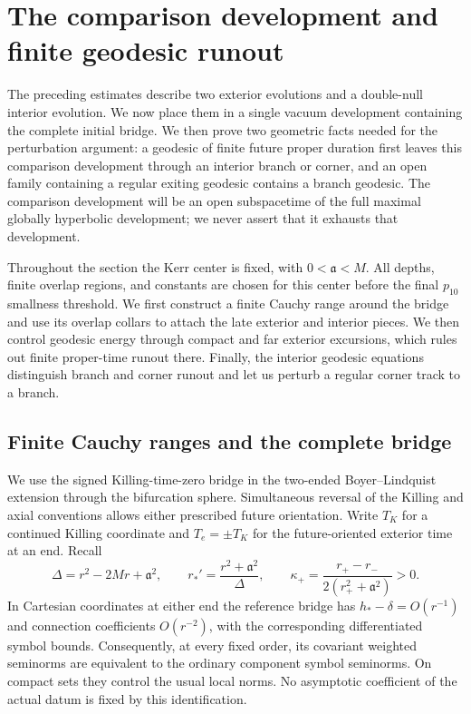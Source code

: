 \section{The comparison development and finite geodesic runout}
\label{sec:comparison}

The preceding estimates describe two exterior evolutions and a
double-null interior evolution. We now place them in a single vacuum
development containing the complete initial bridge. We then prove two
geometric facts needed for the perturbation argument: a geodesic of
finite future proper duration first leaves this comparison development
through an interior branch or corner, and an open family containing a
regular exiting geodesic contains a branch geodesic. The comparison
development will be an open subspacetime of the full maximal globally
hyperbolic development; we never assert that it exhausts that development.

Throughout the section the Kerr center is fixed, with
$0<\mathfrak a<M$. All depths, finite overlap regions, and constants are
chosen for this center before the final $p_{10}$ smallness threshold.
We first construct a finite Cauchy range around the bridge and use
its overlap collars to attach the late exterior and interior pieces.
We then control geodesic energy through compact and far exterior
excursions, which rules out finite proper-time runout there. Finally,
the interior geodesic equations distinguish branch and corner runout
and let us perturb a regular corner track to a branch.

\subsection{Finite Cauchy ranges and the complete bridge}

We use the signed Killing-time-zero bridge in the two-ended
Boyer--Lindquist extension through the bifurcation sphere. Simultaneous
reversal of the Killing and axial conventions allows either prescribed
future orientation. Write $T_K$ for a continued Killing coordinate and
$T_e=\pm T_K$ for the future-oriented exterior time at an end. Recall
\[
 \Delta=r^2-2Mr+\mathfrak a^2,
 \qquad r_*'=\frac{r^2+\mathfrak a^2}{\Delta},
 \qquad
 \kappa_+=\frac{r_+-r_-}{2(r_+^2+\mathfrak a^2)}>0.
\]
In Cartesian coordinates at either end the reference bridge has
$h_*-\delta=O(r^{-1})$ and connection coefficients $O(r^{-2})$, with
the corresponding differentiated symbol bounds. Consequently, at every
fixed order, its covariant weighted seminorms are equivalent to the
ordinary component symbol seminorms. On compact sets they control the
usual local norms. No asymptotic coefficient of the actual datum is
fixed by this identification.

